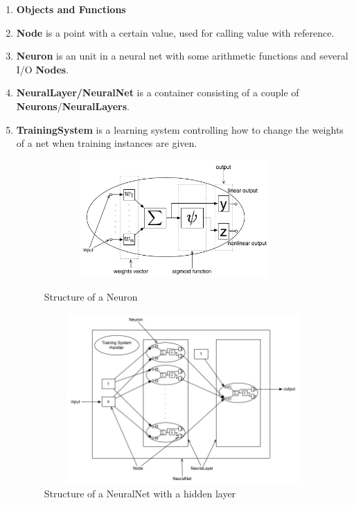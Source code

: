\documentclass[12pt]{article}
\makeatletter
\renewenvironment{itemize}
{\list{$\bullet$}{\leftmargin\z@ \labelwidth\z@ \itemindent-\leftmargin
\let\makelabel\descriptionlabel}}
{\endlist}
\makeatother
\begin{document}
\begin{enumerate}
	\item {\bf Objects and Functions}
	\begin{itemize}
		\item {\bf Node} is a point with a certain value, used for calling value with reference.
		\item {\bf Neuron} is an unit in a neural net with some arithmetic functions and several I/O {\bf Nodes}.
		\item {\bf NeuralLayer/NeuralNet} is a container consisting of a couple of {\bf Neurons}/{\bf NeuralLayers}.
		\item {\bf TrainingSystem} is a learning system controlling how to change the weights of a net when training instances are given.
	\end{itemize}
	
	\vspace*{-2.5em}
	\begin{figure}[ht]
		\centering
		\hspace*{-6em}
		\begin{minipage}[b]{.45\linewidth}
			\includegraphics[width=10cm, height=4.5cm]{../res/Neuron.png}
			\caption{Structure of a Neuron}
		\end{minipage}
		\hspace{3em}
		\begin{minipage}[b]{.54\linewidth}
			\includegraphics[width=12cm, height=6.5cm]{../res/NeuralNet.png}
			\caption{Structure of a NeuralNet with a hidden layer}
		\end{minipage}
	\end{figure}
	

\end{enumerate}
\end{document}
